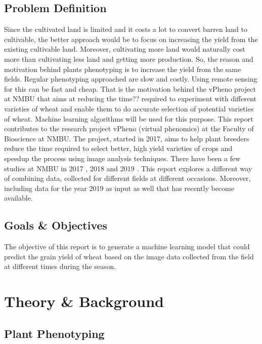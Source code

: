 \documentclass[sigconf, nonacm, natbib, screen, balance=False]{acmart}
\begin{document}
\subsection{Problem Definition}\label{sec:aspect1}

Since the cultivated land is limited and it costs a lot to convert barren land to cultivable, the better approach would be to focus on increasing the yield from the existing cultivable land. Moreover, cultivating more land would naturally cost more than cultivating less land and getting more production. So, the reason and motivation behind plants phenotyping is to increase the yield from the same fields. Regular phenotyping approached are slow and costly. Using remote sensing for this can be fast and cheap. That is the motivation behind the vPheno project at NMBU that aims at reducing the time?? required to experiment with different varieties of wheat and enable them to do accurate selection of potential varieties of wheat. Machine learning algorithms will be used for this purpose.
This report contributes to the research project vPheno (virtual phenomics) at the Faculty of Bioscience at NMBU. The project, started in 2017, aims to help plant breeders reduce the time required to select better, high yield varieties of crops and speedup the process using image analysis techniques. There have been a few studies at NMBU in 2017 \cite{burud_bleken}, 2018 \cite{grindbakken} and 2019 \cite{lied}. This report explores a different way of combining data, collected for different fields at different occasions. Moreover, including data for the year 2019 as input as well that has recently become available.

\subsection{Goals & Objectives}\label{sec:aspect1}

The objective of this report is to generate a machine learning model that could predict the grain yield of wheat based on the image data collected from the field at different times during the season.

\section{Theory & Background}\label{sec:theory}


\subsection{Plant Phenotyping}\label{sec:aspect1}
\end{document}
